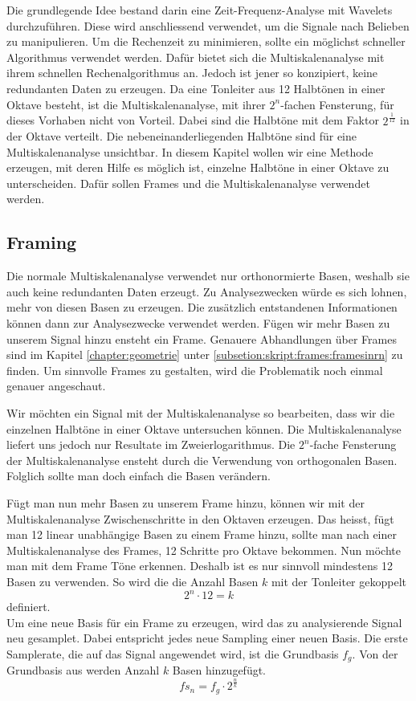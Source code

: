 



Die grundlegende Idee bestand darin eine Zeit-Frequenz-Analyse mit Wavelets durchzuführen. Diese wird anschliessend verwendet, um die Signale nach Belieben zu manipulieren. Um die Rechenzeit zu minimieren, sollte ein möglichst schneller Algorithmus verwendet werden. Dafür bietet sich die Multiskalenanalyse mit ihrem schnellen Rechenalgorithmus an. Jedoch ist jener so konzipiert, keine redundanten Daten zu erzeugen. Da eine Tonleiter aus 12 Halbtönen in einer Oktave besteht, ist die Multiskalenanalyse, mit ihrer $2^{n}$-fachen Fensterung, für dieses Vorhaben nicht von Vorteil. Dabei sind die Halbtöne mit dem Faktor $2^{\frac{1}{12}}$ in der Oktave verteilt. Die nebeneinanderliegenden Halbtöne sind für eine Multiskalenanalyse unsichtbar. 
In diesem Kapitel wollen wir eine Methode erzeugen, mit deren Hilfe es möglich ist, einzelne Halbtöne in einer Oktave zu unterscheiden. Dafür sollen Frames und die Multiskalenanalyse verwendet werden.




\subsection{Framing}

Die normale Multiskalenanalyse verwendet nur orthonormierte Basen, weshalb sie auch keine redundanten Daten erzeugt. Zu Analysezwecken würde es sich lohnen, mehr von diesen Basen zu erzeugen. Die zusätzlich entstandenen Informationen können dann zur Analysezwecke verwendet werden. Fügen wir mehr Basen zu unserem Signal hinzu ensteht ein Frame. Genauere Abhandlungen über Frames sind im Kapitel \ref{chapter:geometrie} unter \ref{subsetion:skript:frames:framesinrn} zu finden. Um sinnvolle Frames zu gestalten, wird die Problematik noch einmal genauer angeschaut.

Wir möchten ein Signal mit der Multiskalenanalyse so bearbeiten, dass wir die einzelnen Halbtöne in einer Oktave untersuchen können. Die Multiskalenanalyse liefert uns jedoch nur Resultate im Zweierlogarithmus. Die $2^{n}$-fache Fensterung der Multiskalenanalyse ensteht durch die Verwendung von orthogonalen Basen. Folglich sollte man doch einfach die Basen verändern.

Fügt man nun mehr Basen zu unserem Frame hinzu, können wir mit der Multiskalenanalyse Zwischenschritte in den Oktaven erzeugen. Das heisst, fügt man 12 linear unabhängige Basen zu einem Frame hinzu, sollte man nach einer Multiskalenanalyse des Frames, 12 Schritte pro Oktave bekommen. Nun möchte man mit dem Frame Töne erkennen. Deshalb ist es nur sinnvoll mindestens 12 Basen zu verwenden. So wird die die Anzahl Basen $k$ mit der Tonleiter gekoppelt
\[ 2^{n} \cdot 12 = k \]
definiert.\\
Um eine neue Basis für ein Frame zu erzeugen, wird das zu analysierende Signal neu gesamplet. Dabei entspricht jedes neue Sampling einer neuen Basis. Die erste Samplerate, die auf das Signal angewendet wird, ist die Grundbasis $f_{g}$. Von der Grundbasis aus werden Anzahl $k$ Basen hinzugefügt.
\[fs_{n}=f_{g}\cdot2^{\frac{n}{k}}\]

